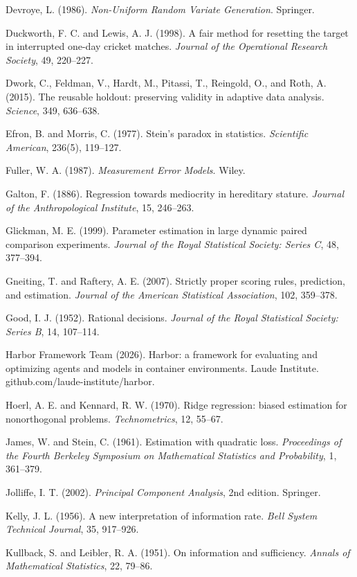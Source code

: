 \documentclass[11pt,letterpaper]{article}
\begin{document}
\begin{footnotesize}
\begin{enumerate}[leftmargin=1.6em, itemsep=1pt, label={[\arabic*]}]
\item Devroye, L. (1986). \emph{Non-Uniform Random Variate Generation}. Springer.
\item Duckworth, F. C. and Lewis, A. J. (1998). A fair method for resetting the target in interrupted one-day cricket matches. \emph{Journal of the Operational Research Society}, 49, 220--227.
\item Dwork, C., Feldman, V., Hardt, M., Pitassi, T., Reingold, O., and Roth, A. (2015). The reusable holdout: preserving validity in adaptive data analysis. \emph{Science}, 349, 636--638.
\item Efron, B. and Morris, C. (1977). Stein's paradox in statistics. \emph{Scientific American}, 236(5), 119--127.
\item Fuller, W. A. (1987). \emph{Measurement Error Models}. Wiley.
\item Galton, F. (1886). Regression towards mediocrity in hereditary stature. \emph{Journal of the Anthropological Institute}, 15, 246--263.
\item Glickman, M. E. (1999). Parameter estimation in large dynamic paired comparison experiments. \emph{Journal of the Royal Statistical Society: Series C}, 48, 377--394.
\item Gneiting, T. and Raftery, A. E. (2007). Strictly proper scoring rules, prediction, and estimation. \emph{Journal of the American Statistical Association}, 102, 359--378.
\item Good, I. J. (1952). Rational decisions. \emph{Journal of the Royal Statistical Society: Series B}, 14, 107--114.
\item Harbor Framework Team (2026). Harbor: a framework for evaluating and optimizing agents and models in container environments. Laude Institute. github.com/laude-institute/harbor.
\item Hoerl, A. E. and Kennard, R. W. (1970). Ridge regression: biased estimation for nonorthogonal problems. \emph{Technometrics}, 12, 55--67.
\item James, W. and Stein, C. (1961). Estimation with quadratic loss. \emph{Proceedings of the Fourth Berkeley Symposium on Mathematical Statistics and Probability}, 1, 361--379.
\item Jolliffe, I. T. (2002). \emph{Principal Component Analysis}, 2nd edition. Springer.
\item Kelly, J. L. (1956). A new interpretation of information rate. \emph{Bell System Technical Journal}, 35, 917--926.
\item Kullback, S. and Leibler, R. A. (1951). On information and sufficiency. \emph{Annals of Mathematical Statistics}, 22, 79--86.

\end{enumerate}
\end{footnotesize}
\end{document}
